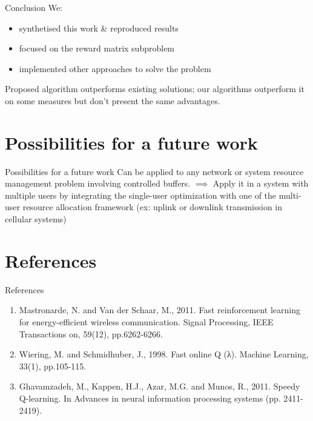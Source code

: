 \documentclass{beamer}
\begin{document}
\begin{frame}{Conclusion}
We:
\begin{itemize}
\item synthetised this work \& reproduced results
\item focused on the reward matrix subproblem
\item implemented other approaches to solve the problem
\end{itemize}
Proposed algorithm outperforms existing solutions;
our algorithms outperform it on some measures but don't present the same advantages.
\end{frame}

\section{Possibilities for a future work}
\begin{frame}{Possibilities for a future work}
Can be applied to any network or system resource management problem involving controlled buffers.
$\implies$ Apply it in a system with multiple users by integrating the single-user optimization with one of the multi-user resource allocation framework (ex: uplink or downlink transmission in cellular systems)
\end{frame}

\section{References}
\begin{frame}{References}
\begin{enumerate}
\item Mastronarde, N. and Van der Schaar, M., 2011. Fast reinforcement learning for energy-efficient wireless communication. Signal Processing, IEEE Transactions on, 59(12), pp.6262-6266.
\item Wiering, M. and Schmidhuber, J., 1998. Fast online Q (λ). Machine Learning, 33(1), pp.105-115.
\item Ghavamzadeh, M., Kappen, H.J., Azar, M.G. and Munos, R., 2011. Speedy Q-learning. In Advances in neural information processing systems (pp. 2411-2419).
\end{enumerate}
\end{frame}
\end{document}
